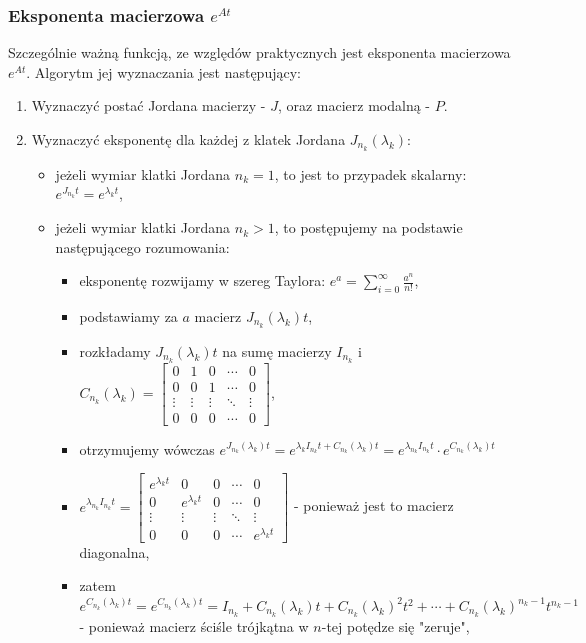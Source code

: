 \documentclass{article}
\begin{document}
\subsubsection{Eksponenta macierzowa $e^{At}$}
Szczególnie ważną funkcją, ze względów praktycznych jest eksponenta macierzowa $e^{At}$.
Algorytm jej wyznaczania jest następujący:
\begin{enumerate}
    \item Wyznaczyć postać Jordana macierzy - $J$, oraz macierz modalną - $P$.
    \item Wyznaczyć eksponentę dla każdej z klatek Jordana $J_{n_{k}}(\lambda_{k})$:
    \begin{itemize}
        \item jeżeli wymiar klatki Jordana $n_{k} = 1$, to jest to przypadek skalarny: $e^{J_{n_{k}}t} = e^{\lambda_{k}t}$,
        \item jeżeli wymiar klatki Jordana $n_{k} > 1$, to postępujemy na podstawie następującego rozumowania:
            \begin{itemize}
                \item eksponentę rozwijamy w szereg Taylora: $e^{a} = \sum_{i=0}^{\infty}{\frac{a^n}{n!}}$,
                \item podstawiamy za $a$ macierz $J_{n_k}(\lambda_k)t$,
                \item rozkładamy $J_{n_k}(\lambda_k)t$ na sumę macierzy $I_{n_k}$ i $C_{n_k}(\lambda_k) = \begin{bmatrix} 0 & 1 & 0 & \cdots & 0\\ 0 & 0 & 1 & \cdots & 0\\ \vdots & \vdots & \vdots & \ddots & \vdots\\ 0 & 0 & 0 & \cdots & 0 \end{bmatrix}$,
                \item otrzymujemy wówczas $e^{J_{n_k}(\lambda_{k})t}  = e^{\lambda_{k}I_{n_k}t + C_{n_k}(\lambda_k)t} = e^{\lambda_{n_k}I_{n_k}t} \cdot e^{C_{n_k}(\lambda_k)t}$
                \item $e^{\lambda_{n_k}I_{n_k}t} =  \begin{bmatrix} e^{\lambda_{k}t} & 0 & 0 & \cdots & 0\\ 0 & e^{\lambda_{k}t} & 0 & \cdots & 0\\ \vdots & \vdots & \vdots & \ddots & \vdots\\ 0 & 0 & 0 & \cdots & e^{\lambda_{k}t} \end{bmatrix}$ - ponieważ jest to macierz diagonalna,
                \item zatem $e^{C_{n_k}(\lambda_{k})t}  = e^{C_{n_k}(\lambda_k)t} = I_{n_k} + C_{n_k}(\lambda_k)t + C_{n_k}(\lambda_k)^{2}t^2 + \cdots + C_{n_k}(\lambda_k)^{n_k -1}t^{n_k -1}$ - ponieważ macierz ściśle trójkątna w $n$-tej potędze się "zeruje",

\end{itemize}
\end{itemize}
\end{enumerate}
\end{document}
